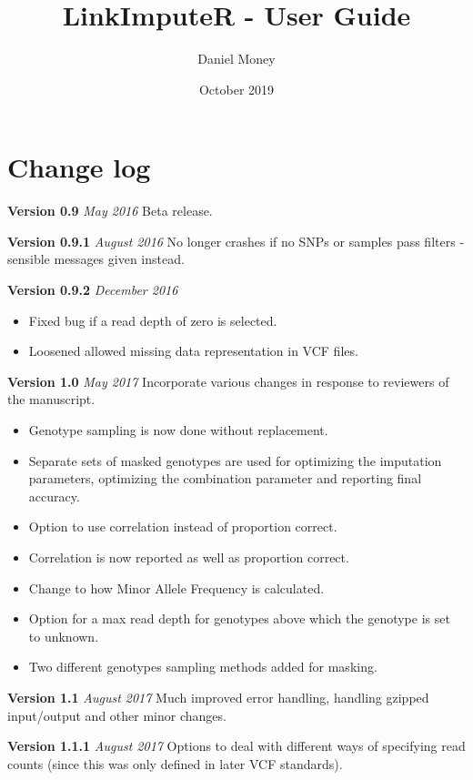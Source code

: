\documentclass[10pt]{report}
\title{LinkImputeR - User Guide}
\author{Daniel Money}
\date{October 2019}
\begin{document}
\setcounter{tocdepth}{1}
\maketitle
\tableofcontents

\section{Change log}

\textbf{Version 0.9} \textit{May 2016} Beta release.

\textbf{Version 0.9.1} \textit{August 2016} No longer crashes if no SNPs or samples pass filters - sensible messages given instead.

\textbf{Version 0.9.2} \textit{December 2016}
\begin{itemize}
    \item Fixed bug if a read depth of zero is selected.
    \item Loosened allowed missing data representation in VCF files.
\end{itemize}

\textbf{Version 1.0} \textit{May 2017} Incorporate various changes in response to reviewers of the manuscript.
\begin{itemize}
	\item Genotype sampling is now done without replacement.
	\item Separate sets of masked genotypes are used for optimizing the imputation parameters, optimizing the combination parameter and reporting final accuracy.
	\item Option to use correlation instead of proportion correct.
	\item Correlation is now reported as well as proportion correct.
	\item Change to how Minor Allele Frequency is calculated.
	\item Option for a max read depth for genotypes above which the genotype is set to unknown.
	\item Two different genotypes sampling methods added for masking.
\end{itemize}

\textbf{Version 1.1} \textit{August 2017} Much improved error handling, handling gzipped input/output and other minor changes.

\textbf{Version 1.1.1} \textit{August 2017} Options to deal with different ways of specifying read counts (since this was only defined in later VCF standards).
\end{document}
